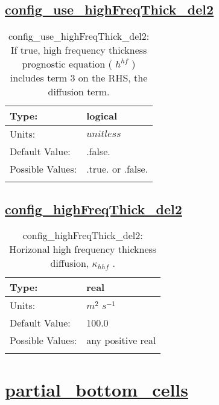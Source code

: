 \subsection[config\_use\_highFreqThick\_del2]{\hyperref[sec:nm_tab_ALE_frequency_filtered_thickness]{config\_use\_highFreqThick\_del2}}
\label{subsec:nm_sec_config_use_highFreqThick_del2}
\begin{center}
\begin{longtable}{| p{2.0in} || p{4.0in} |}
    \hline
    Type: & logical \\
    \hline
    Units: & $unitless$ \\
    \hline
    Default Value: & .false. \\
    \hline
    Possible Values: & .true. or .false. \\
    \hline
    \caption{config\_use\_highFreqThick\_del2:  If true, high frequency thickness prognostic equation ( $h^{hf}$ ) includes term 3 on the RHS, the diffusion term.}
\end{longtable}
\end{center}
\subsection[config\_highFreqThick\_del2]{\hyperref[sec:nm_tab_ALE_frequency_filtered_thickness]{config\_highFreqThick\_del2}}
\label{subsec:nm_sec_config_highFreqThick_del2}
\begin{center}
\begin{longtable}{| p{2.0in} || p{4.0in} |}
    \hline
    Type: & real \\
    \hline
    Units: & $m^2$ $s^{-1}$ \\
    \hline
    Default Value: & 100.0 \\
    \hline
    Possible Values: & any positive real \\
    \hline
    \caption{config\_highFreqThick\_del2:  Horizonal high frequency thickness diffusion,  $\kappa_{hhf}$ .}
\end{longtable}
\end{center}
\section[partial\_bottom\_cells]{\hyperref[sec:nm_tab_partial_bottom_cells]{partial\_bottom\_cells}}
\label{sec:nm_sec_partial_bottom_cells}
